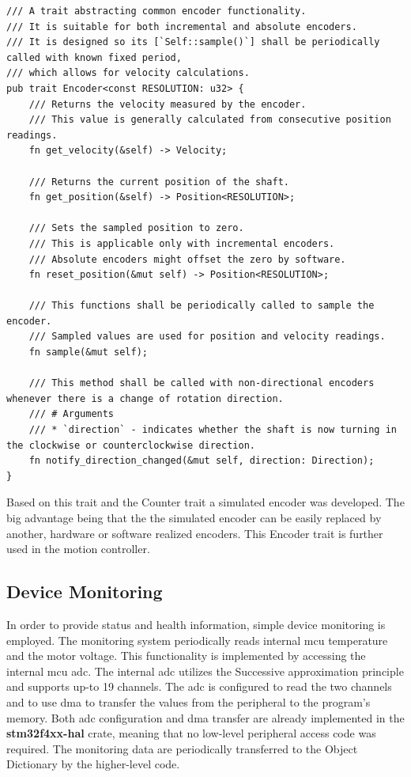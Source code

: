 \begin{lstlisting}[caption={Encoder trait for abstracting encoders.},label=lst:encoder_trait]
/// A trait abstracting common encoder functionality.
/// It is suitable for both incremental and absolute encoders.
/// It is designed so its [`Self::sample()`] shall be periodically called with known fixed period,
/// which allows for velocity calculations.
pub trait Encoder<const RESOLUTION: u32> {
    /// Returns the velocity measured by the encoder.
    /// This value is generally calculated from consecutive position readings.
    fn get_velocity(&self) -> Velocity;

    /// Returns the current position of the shaft.
    fn get_position(&self) -> Position<RESOLUTION>;

    /// Sets the sampled position to zero.
    /// This is applicable only with incremental encoders.
    /// Absolute encoders might offset the zero by software.
    fn reset_position(&mut self) -> Position<RESOLUTION>;

    /// This functions shall be periodically called to sample the encoder.
    /// Sampled values are used for position and velocity readings.
    fn sample(&mut self);

    /// This method shall be called with non-directional encoders whenever there is a change of rotation direction.
    /// # Arguments
    /// * `direction` - indicates whether the shaft is now turning in the clockwise or counterclockwise direction.
    fn notify_direction_changed(&mut self, direction: Direction);
}
\end{lstlisting}

Based on this trait and the Counter trait a simulated encoder was developed.
The big advantage being that the the simulated encoder can be easily replaced by another, hardware or software realized encoders.
This Encoder trait is further used in the motion controller.

\subsection{Device Monitoring}
\label{subsec:device_monitoring}
In order to provide status and health information, simple device monitoring is employed.
The monitoring system periodically reads internal \acs{mcu} temperature and the motor voltage.
This functionality is implemented by accessing the internal \acs{mcu} \acs{adc}.
The internal \acs{adc} utilizes the Successive approximation principle and supports up-to 19 channels\cite{stmicro_stm32f405xx_2020}.
The \acs{adc} is configured to read the two channels and to use \acs{dma} to transfer the values from the peripheral to the program's memory.
Both \acs{adc} configuration and \acs{dma} transfer are already implemented in the \textbf{stm32f4xx-hal} crate, meaning that no low-level peripheral access code was required.
The monitoring data are periodically transferred to the Object Dictionary by the higher-level code.

